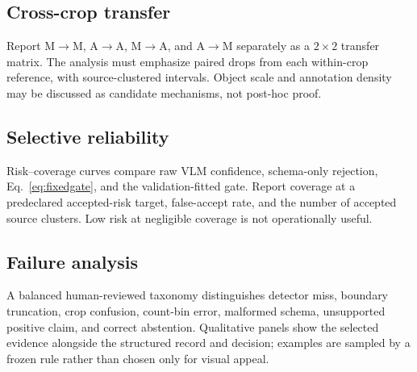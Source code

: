 \subsection{Cross-crop transfer}
Report M$\rightarrow$M, A$\rightarrow$A, M$\rightarrow$A, and A$\rightarrow$M separately as a $2\times2$ transfer matrix. The analysis must emphasize paired drops from each within-crop reference, with source-clustered intervals. Object scale and annotation density may be discussed as candidate mechanisms, not post-hoc proof.

\subsection{Selective reliability}
Risk--coverage curves compare raw VLM confidence, schema-only rejection, Eq.~\eqref{eq:fixedgate}, and the validation-fitted gate. Report coverage at a predeclared accepted-risk target, false-accept rate, and the number of accepted source clusters. Low risk at negligible coverage is not operationally useful.

\subsection{Failure analysis}
A balanced human-reviewed taxonomy distinguishes detector miss, boundary truncation, crop confusion, count-bin error, malformed schema, unsupported positive claim, and correct abstention. Qualitative panels show the selected evidence alongside the structured record and decision; examples are sampled by a frozen rule rather than chosen only for visual appeal.
